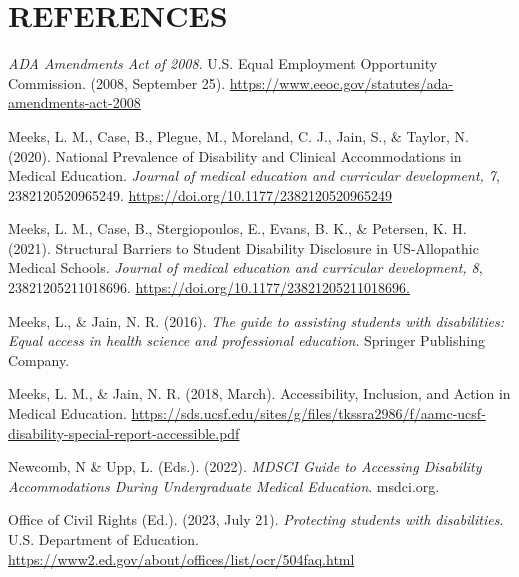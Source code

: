 \documentclass[11.5pt]{sig-alternate} %
\begin{document}
\section*{REFERENCES}\par 

\leftskip 0.25in
\parindent -0.25in %

\textit{ADA Amendments Act of 2008}. U.S. Equal Employment Opportunity Commission. (2008, September 25). \url{https://www.eeoc.gov/statutes/ada-amendments-act-2008}

Meeks, L. M., Case, B., Plegue, M., Moreland, C. J., Jain, S., \& Taylor, N. (2020). National Prevalence of Disability and Clinical Accommodations in Medical Education. \textit{Journal of medical education and curricular development, 7}, 2382120520965249. \url{https://doi.org/10.1177/2382120520965249}

Meeks, L. M., Case, B., Stergiopoulos, E., Evans, B. K., \& Petersen, K. H. (2021). Structural Barriers to Student Disability Disclosure in US-Allopathic Medical Schools. \textit{Journal of medical education and curricular development, 8}, 23821205211018696. \url{https://doi.org/10.1177/23821205211018696.}

Meeks, L., \& Jain, N. R. (2016). \textit{The guide to assisting students with disabilities: Equal access in health science and professional education}. Springer Publishing Company. 

Meeks, L. M., \& Jain, N. R. (2018, March). Accessibility, Inclusion, and Action in Medical Education. \url{https://sds.ucsf.edu/sites/g/files/tkssra2986/f/aamc-ucsf-disability-special-report-accessible.pdf}

Newcomb, N  \&  Upp, L. (Eds.). (2022). \textit{MDSCI Guide to Accessing Disability Accommodations During Undergraduate Medical Education}. msdci.org.

Office of Civil Rights (Ed.). (2023, July 21). \textit{Protecting students with disabilities}. U.S. Department of Education. \url{https://www2.ed.gov/about/offices/list/ocr/504faq.html}
\end{document}
